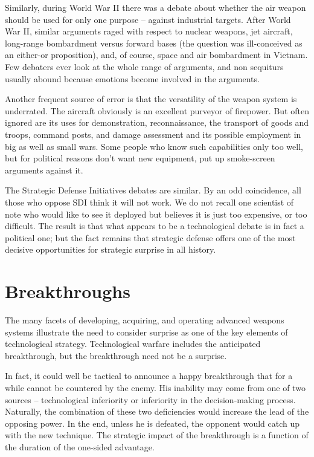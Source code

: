 Similarly, during World War II there was a debate about whether the air weapon should be used for only one purpose -- against industrial targets. After World War II, similar arguments raged with respect to nuclear weapons, jet aircraft, long-range bombardment versus forward bases (the question was ill-conceived as an either-or proposition), and, of course, space and air bombardment in Vietnam. Few debaters ever look at the whole range of arguments, and non sequiturs usually abound because emotions become involved in the arguments.

Another frequent source of error is that the versatility of the weapon system is underrated. The aircraft obviously is an excellent purveyor of firepower. But often ignored are its uses for demonstration, reconnaissance, the transport of goods and troops, command posts, and damage assessment and its possible employment in big as well as small wars. Some people who know such capabilities only too well, but for political reasons don't want new equipment, put up smoke-screen arguments against it.

The Strategic Defense Initiatives debates are similar. By an odd coincidence, all those who oppose SDI think it will not work. We do not recall one scientist of note who would like to see it deployed but believes it is just too expensive, or too difficult. The result is that what appears to be a technological debate is in fact a political one; but the fact remains that strategic defense offers one of the most decisive opportunities for strategic surprise in all history.

\section{Breakthroughs}
The many facets of developing, acquiring, and operating advanced weapons systems illustrate the need to consider surprise as one of the key elements of technological strategy. Technological warfare includes the anticipated breakthrough, but the breakthrough need not be a surprise.

In fact, it could well be tactical to announce a happy breakthrough that for a while cannot be countered by the enemy. His inability may come from one of two sources -- technological inferiority or inferiority in the decision-making process. Naturally, the combination of these two deficiencies would increase the lead of the opposing power. In the end, unless he is defeated, the opponent would catch up with the new technique. The strategic impact of the breakthrough is a function of the duration of the one-sided advantage.

